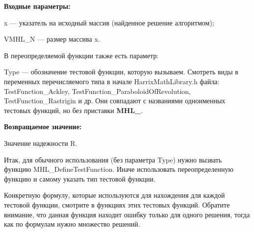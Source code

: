 \textbf{Входные параметры:}

x --- указатель на исходный массив (найденное решение алгоритмом);

VMHL\_N --- размер массива x.

В переопределяемой функции также есть параметр:
  
Type --- обозначение тестовой функции, которую вызываем.
Смотреть виды в переменных перечисляемого типа в начале HarrixMathLibrary.h файла: TestFunction\_Ackley, TestFunction\_ParaboloidOfRevolution, TestFunction\_Rastrigin и др. Они совпадают с названиями одноименных тестовых функций, но без приставки \textbf{MHL\_}.

\textbf{Возвращаемое значение:}
 
Значение надежности R.

Итак, для обычного использования (без параметра Type) нужно вызвать функцию MHL\_DefineTestFunction. Иначе использовать переопределенную функцию и самому указать тип тестовой функции.

Конкретную формулу, которые используются для нахождения для каждой тестовой функции, смотрите в функциях этих тестовых функций. Обратите внимание, что данная функция находит ошибку только для одного решения, тогда как по формулам нужно множество решений.